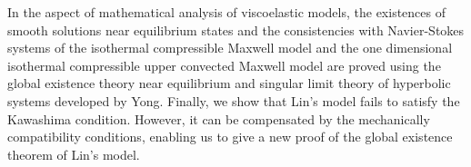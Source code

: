 \begin{eabstract}
    In the aspect of mathematical analysis of viscoelastic models, the existences of smooth solutions near equilibrium states and the consistencies with Navier-Stokes systems of the isothermal compressible Maxwell model and the one dimensional isothermal compressible upper convected Maxwell model are proved using the global existence theory near equilibrium and singular limit theory of hyperbolic systems developed by Yong. Finally, we show that Lin's model fails to satisfy the Kawashima condition. However, it can be compensated by the mechanically compatibility conditions, enabling us to give a new proof of the global existence theorem of Lin's model.

  

\end{eabstract}

